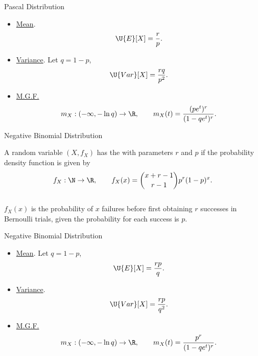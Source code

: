 \begin{frame}{Pascal Distribution}

\justifying
{} 
\begin{itemize}
\justifying
\item \underline{Mean}.
\begin{align*}
\U{E}[X] = \frac{r}{p}.
\end{align*}
\item \underline{Variance}. Let $q = 1 - p$,
\begin{align*}
\U{Var}[X] = \frac{rq}{p^2}.
\end{align*}
\item \underline{M.G.F.}
\begin{align*}
m_X: (-\infty, -\ln q) \rightarrow \R, \qquad m_X(t) = \frac{(pe^t)^r}{(1-qe^t)^r}.
\end{align*}
\end{itemize}

\end{frame}


\begin{frame}{Negative Binomial Distribution}

\justifying
{} A random variable $(X, f_X)$ has the  with parameters $r$ and $p$ if the probability density function is given by
\begin{align*}
f_X: \N \rightarrow \R, \qquad f_X(x) = \binom{x+r-1}{r-1} p^r(1-p)^{x}.
\end{align*}
~\\
 $f_X(x)$ is the probability of $x$ failures before first obtaining $r$ successes in Bernoulli trials, given the probability for each success is $p$.

\end{frame}

\begin{frame}{Negative Binomial Distribution}

\justifying
{} 
\begin{itemize}
\justifying
\item \underline{Mean}. Let $q = 1 - p$,
\begin{align*}
\U{E}[X] = \frac{rp}{q}.
\end{align*}
\item \underline{Variance}.
\begin{align*}
\U{Var}[X] = \frac{rp}{q^2}.
\end{align*}
\item \underline{M.G.F.}
\begin{align*}
m_X: (-\infty, -\ln q) \rightarrow \R, \qquad m_X(t) = \frac{p^r}{(1-qe^t)^r}.
\end{align*}
\end{itemize}

\end{frame}

